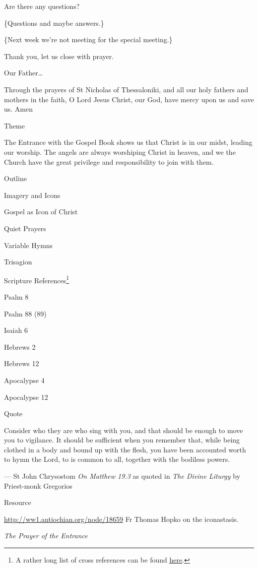\documentclass[
]{article}
\begin{document}
Are there any questions?

\{Questions and maybe answers.\}

\{Next week we're not meeting for the special meeting.\}

Thank you, let us close with prayer.

Our Father\ldots{}

Through the prayers of St Nicholas of Thessaloniki, and all our holy
fathers and mothers in the faith, O Lord Jesus Christ, our God, have
mercy upon us and save us. Amen

Theme

The Entrance with the Gospel Book shows us that Christ is in our midst,
leading our worship. The angels are always worshiping Christ in heaven,
and we the Church have the great privilege and responsibility to join
with them.

Outline

Imagery and Icons

Gospel as Icon of Christ

Quiet Prayers

Variable Hymns

Trisagion

Scripture References\footnote{A rather long list of cross references can
  be found
  \href{http://jimmyakin.com/deuterocanonical-references-in-the-new-testament}{\ul{here}}.}

Psalm 8

Psalm 88 (89)

Isaiah 6

Hebrews 2

Hebrews 12

Apocalypse 4

Apocalypse 12

Quote

Consider who they are who sing with you, and that should be enough to
move you to vigilance. It should be sufficient when you remember that,
while being clothed in a body and bound up with the flesh, you have been
accounted worth to hymn the Lord, to is common to all, together with the
bodiless powers.

--- St John Chrysostom \emph{On Matthew 19.3} as quoted in \emph{The
Divine Liturgy} by Priest-monk Gregorios

Resource

\href{http://ww1.antiochian.org/node/18659}{\ul{http://ww1.antiochian.org/node/18659}}
Fr Thomas Hopko on the iconastasis.

\emph{The Prayer of the Entrance}
\end{document}

